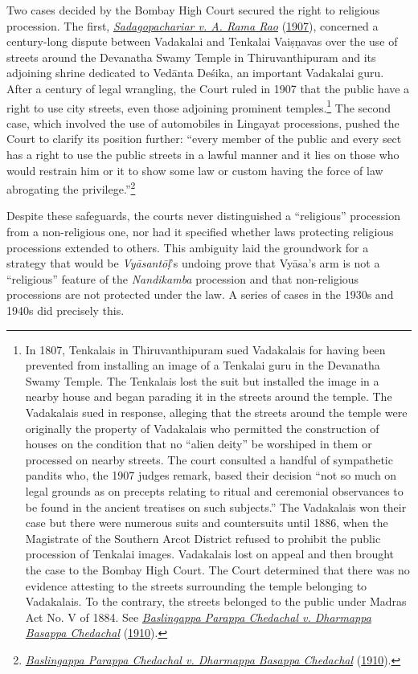 Two cases decided by the Bombay High Court secured the right to religious procession. The first, \hyperref[Sadagopachariar]{\emph{Sadagopachariar v. A. Rama Rao}} (\hyperref[Sadagopachariar]{1907}), concerned a century-long dispute between Vadakalai and Tenkalai Vaiṣṇavas over the use of streets around the Devanatha Swamy Temple in Thiruvanthipuram and its adjoining shrine dedicated to Vedānta Deśika, an important Vadakalai guru. After a century of legal wrangling, the Court ruled in 1907 that the public have a right to use city streets, even those adjoining prominent temples.\footnote{%
In 1807, Tenkalais in Thiruvanthipuram sued Vadakalais for having been prevented from installing an image of a Tenkalai guru in the Devanatha Swamy Temple. The Tenkalais lost the suit but installed the image in a nearby house and began parading it in the streets around the temple. The Vadakalais sued in response, alleging that the streets around the temple were originally the property of Vadakalais who permitted the construction of houses on the condition that no “alien deity” be worshiped in them or processed on nearby streets. The court consulted a handful of sympathetic pandits who, the 1907 judges remark, based their decision “not so much on legal grounds as on precepts relating to ritual and ceremonial observances to be found in the ancient treatises on such subjects.” The Vadakalais won their case but there were numerous suits and countersuits until 1886, when the Magistrate of the Southern Arcot District refused to prohibit the public procession of Tenkalai images. Vadakalais lost on appeal and then brought the case to the Bombay High Court. The Court determined that there was no evidence attesting to the streets surrounding the temple belonging to Vadakalais. To the contrary, the streets belonged to the public under Madras Act No. V of 1884. See \hyperref[Baslingappa]{\emph{Baslingappa Parappa Chedachal v. Dharmappa Basappa Chedachal}} (\hyperref[Baslingappa]{1910}).
}
 The second case, which involved the use of automobiles in Lingayat processions, pushed the Court to clarify its position further: “every member of the public and every sect has a right to use the public streets in a lawful manner and it lies on those who would restrain him or it to show some law or custom having the force of law abrogating the privilege.”\footnote{%
\hyperref[Baslingappa]{\emph{Baslingappa Parappa Chedachal v. Dharmappa Basappa Chedachal}} (\hyperref[Baslingappa]{1910}).
}



Despite these safeguards, the courts never distinguished a “religious” procession from a non-religious one, nor had it specified whether laws protecting religious processions extended to others. This ambiguity laid the groundwork for a strategy that would be \emph{Vyāsantōḷ}’s undoing  \Dash  prove that Vyāsa’s arm is not a “religious” feature of the \emph{{Nandikamba}} procession and that non-religious processions are not protected under the law. A series of cases in the 1930s and 1940s did precisely this. 


